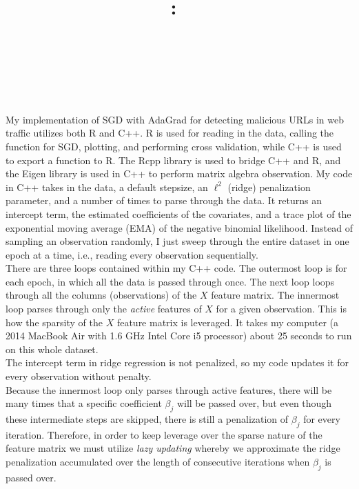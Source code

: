 \documentclass{article}
\title{
\vspace{2in}
\textmd{\textbf{\hmwkClass:\ \hmwkTitle}}\\
\normalsize\vspace{0.1in}\small{\hmwkDueDate}\\
\vspace{0.1in}\large{\textit{\hmwkClassInstructor\ }}
\vspace{3in}
}
\author{\textbf{\hmwkAuthorName}}
\date{} %
\begin{document}
\maketitle

\newpage



My implementation of SGD with AdaGrad for detecting malicious URLs in web traffic utilizes both \textsf{R} and \textsf{C++}. \textsf{R} is used for reading in the data, calling the function for SGD, plotting, and performing cross validation, while \textsf{C++} is used to export a function to \textsf{R}. The \textsf{Rcpp} library is used to bridge \textsf{C++} and \textsf{R}, and the \textsf{Eigen} library is used in \textsf{C++} to perform matrix algebra observation. My code in \textsf{C++} takes in the data, a default stepsize, an $\ell^2$ (ridge) penalization parameter, and a number of times to parse through the data. It returns an intercept term, the estimated coefficients of the covariates, and a trace plot of the exponential moving average (EMA) of the negative binomial likelihood. Instead of sampling an observation randomly, I just sweep through the entire dataset in one epoch at a time, i.e., reading every observation sequentially. \\

There are three loops contained within my \textsf{C++} code. The outermost loop is for each epoch, in which all the data is passed through once. The next loop loops through all the columns (observations) of the $X$ feature matrix. The innermost loop parses through only the \emph{active} features of $X$ for a given observation. This is how the sparsity of the $X$ feature matrix is leveraged. It takes my computer (a 2014 MacBook Air with 1.6 GHz Intel Core i5 processor) about 25 seconds to run on this whole dataset. \\

The intercept term in ridge regression is not penalized, so my code updates it for every observation without penalty.\\

Because the innermost loop only parses through active features, there will be many times that a specific coefficient $\beta_j$ will be passed over, but even though these intermediate steps are skipped, there is still a penalization of $\beta_j$ for every iteration. Therefore, in order to keep leverage over the sparse nature of the feature matrix we must utilize \emph{lazy updating} whereby we approximate the ridge penalization accumulated over the length of consecutive iterations when $\beta_j$ is passed over. \\ 
\end{document}
